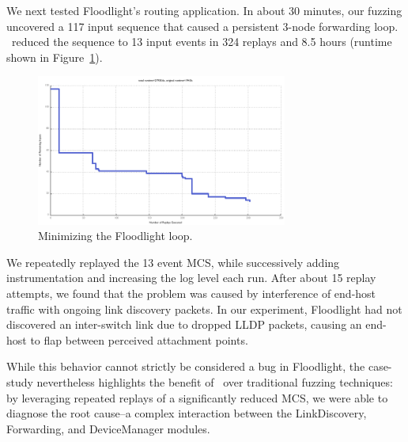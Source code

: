  We next
tested Floodlight's routing application.
In about 30 minutes, our fuzzing uncovered a
117 input sequence that caused a persistent 3-node forwarding loop.
\projectname~reduced the sequence to 13 input events in 324 replays and 8.5
hours (runtime shown in Figure~\ref{fig:fl_loop}).

\begin{figure}[t]
    \includegraphics[width=3.25in]{../graphs/runtime/floodlight_loop.pdf}
    \caption[]{\label{fig:fl_loop} Minimizing the Floodlight loop.}
\end{figure}

We repeatedly replayed the 13 event MCS, while successively adding
instrumentation and increasing the log level each run. After about 15 replay
attempts, we found that the problem was caused by interference of end-host
traffic with ongoing link discovery packets. In our experiment, Floodlight had
not discovered an inter-switch link due to dropped LLDP packets, causing an
end-host to flap between perceived attachment points.

While this behavior cannot strictly be considered a bug in Floodlight,
the case-study nevertheless highlights the benefit of
\projectname~over traditional fuzzing techniques: by leveraging repeated replays
of a significantly reduced MCS, we were able to diagnose the root cause--a
complex interaction between the LinkDiscovery, Forwarding, and DeviceManager
modules.

